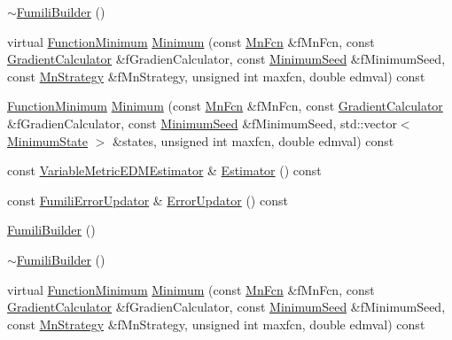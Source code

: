 \begin{DoxyCompactItemize}
\item 
\mbox{\hyperlink{classROOT_1_1Minuit2_1_1FumiliBuilder_a1de07586a1617732f49d59df92c44006}{$\sim$\+Fumili\+Builder}} ()
\item 
virtual \mbox{\hyperlink{classROOT_1_1Minuit2_1_1FunctionMinimum}{Function\+Minimum}} \mbox{\hyperlink{classROOT_1_1Minuit2_1_1FumiliBuilder_aa1889039835b4117cb2a9b7d49e4f6dd}{Minimum}} (const \mbox{\hyperlink{classROOT_1_1Minuit2_1_1MnFcn}{Mn\+Fcn}} \&f\+Mn\+Fcn, const \mbox{\hyperlink{classROOT_1_1Minuit2_1_1GradientCalculator}{Gradient\+Calculator}} \&f\+Gradien\+Calculator, const \mbox{\hyperlink{classROOT_1_1Minuit2_1_1MinimumSeed}{Minimum\+Seed}} \&f\+Minimum\+Seed, const \mbox{\hyperlink{classROOT_1_1Minuit2_1_1MnStrategy}{Mn\+Strategy}} \&f\+Mn\+Strategy, unsigned int maxfcn, double edmval) const
\item 
\mbox{\hyperlink{classROOT_1_1Minuit2_1_1FunctionMinimum}{Function\+Minimum}} \mbox{\hyperlink{classROOT_1_1Minuit2_1_1FumiliBuilder_ac0df0ebc275b75e6a6831f102f1753d2}{Minimum}} (const \mbox{\hyperlink{classROOT_1_1Minuit2_1_1MnFcn}{Mn\+Fcn}} \&f\+Mn\+Fcn, const \mbox{\hyperlink{classROOT_1_1Minuit2_1_1GradientCalculator}{Gradient\+Calculator}} \&f\+Gradien\+Calculator, const \mbox{\hyperlink{classROOT_1_1Minuit2_1_1MinimumSeed}{Minimum\+Seed}} \&f\+Minimum\+Seed, std\+::vector$<$ \mbox{\hyperlink{classROOT_1_1Minuit2_1_1MinimumState}{Minimum\+State}} $>$ \&states, unsigned int maxfcn, double edmval) const
\item 
const \mbox{\hyperlink{classROOT_1_1Minuit2_1_1VariableMetricEDMEstimator}{Variable\+Metric\+E\+D\+M\+Estimator}} \& \mbox{\hyperlink{classROOT_1_1Minuit2_1_1FumiliBuilder_a1e7bd763cd6677dd08d528079143d7b2}{Estimator}} () const
\item 
const \mbox{\hyperlink{classROOT_1_1Minuit2_1_1FumiliErrorUpdator}{Fumili\+Error\+Updator}} \& \mbox{\hyperlink{classROOT_1_1Minuit2_1_1FumiliBuilder_a03face0b120b333aea0b49d5531518ef}{Error\+Updator}} () const
\item 
\mbox{\hyperlink{classROOT_1_1Minuit2_1_1FumiliBuilder_a79c7807308c680ea2e42829171ebe8c1}{Fumili\+Builder}} ()
\item 
\mbox{\hyperlink{classROOT_1_1Minuit2_1_1FumiliBuilder_a1de07586a1617732f49d59df92c44006}{$\sim$\+Fumili\+Builder}} ()
\item 
virtual \mbox{\hyperlink{classROOT_1_1Minuit2_1_1FunctionMinimum}{Function\+Minimum}} \mbox{\hyperlink{classROOT_1_1Minuit2_1_1FumiliBuilder_aa1889039835b4117cb2a9b7d49e4f6dd}{Minimum}} (const \mbox{\hyperlink{classROOT_1_1Minuit2_1_1MnFcn}{Mn\+Fcn}} \&f\+Mn\+Fcn, const \mbox{\hyperlink{classROOT_1_1Minuit2_1_1GradientCalculator}{Gradient\+Calculator}} \&f\+Gradien\+Calculator, const \mbox{\hyperlink{classROOT_1_1Minuit2_1_1MinimumSeed}{Minimum\+Seed}} \&f\+Minimum\+Seed, const \mbox{\hyperlink{classROOT_1_1Minuit2_1_1MnStrategy}{Mn\+Strategy}} \&f\+Mn\+Strategy, unsigned int maxfcn, double edmval) const

\end{DoxyCompactItemize}

